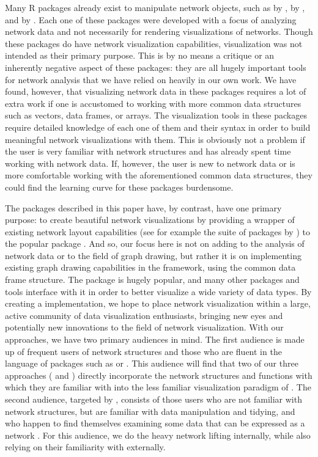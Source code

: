 Many R packages already exist to manipulate network objects, such as  by \citet{igraph},  by \citet{sna}, and  by \citet{network} \citep[see also]{network.jss}. Each one of these packages were developed with a focus of analyzing network data and not necessarily for rendering visualizations of networks. Though these packages do have network visualization capabilities, visualization was not intended as their primary purpose. This is by no means a critique or an inherently negative aspect of these packages: they are all hugely important tools for network analysis that we have relied on heavily in our own work.  We have found, however, that visualizing network data in these packages requires a lot of extra work if one is accustomed to working with more common data structures such as vectors, data frames, or arrays. The visualization tools in these packages require detailed knowledge of each one of them and their syntax in order to build meaningful network visualizations with them. This is obviously not a problem if the user is very familiar with network structures and has already spent time working with network data. If, however, the user is new to network data or is more comfortable working with the aforementioned common data structures, they could find the learning curve for these packages burdensome.
 
The packages described in this paper have, by contrast, have one primary purpose: to create beautiful network visualizations by providing a wrapper of existing network layout capabilities (see for example the  suite of packages by \citet{statnet}) to the popular  package \citep{ggplot2}. And so, our focus here is not on adding to the analysis of network data or to the field of graph drawing, \citep[cf.\ ][]{graphdrawing} but rather it is on implementing existing graph drawing capabilities in the  framework, using the common data frame structure. The  package is hugely popular, and many other packages and tools interface with it in order to better visualize a wide variety of data types. By creating a  implementation, we hope to place network visualization within a large, active community of data visualization enthusiasts, bringing new eyes and potentially new innovations to the field of network visualization. With our approaches, we have two primary audiences in mind. The first audience is made up of frequent users of network structures and those who are fluent in the language of packages such as  or . This audience will find that two of our three approaches ( and ) directly incorporate the network structures and functions with which they are familiar with into the less familiar visualization paradigm of  \citep{ggnetwork}. The second audience, targeted by  , consists of those users who are not familiar with network structures, but are familiar with data manipulation and tidying, and who happen to find themselves examining some data that can be expressed as a network \citep{geomnet}. For this audience, we do the heavy network lifting internally, while also relying on their familiarity with  externally. 

